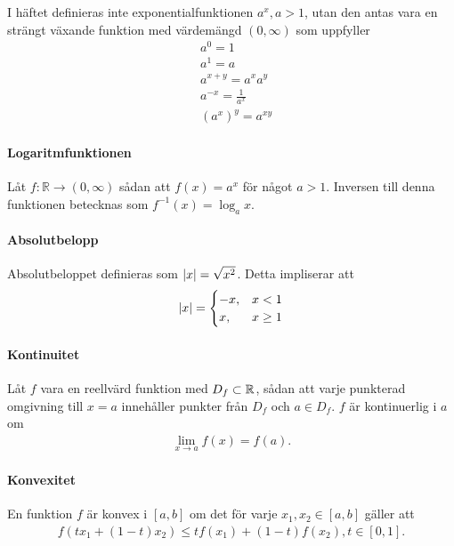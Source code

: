 I häftet definieras inte exponentialfunktionen $a^x, a>1$, utan den antas vara en strängt växande funktion med värdemängd $(0,\infty)$ som uppfyller
\begin{align*}
	&a^0 = 1\\
	&a^1 = a\\
	&a^{x + y} = a^x a^y\\
	&a^{-x} = \frac{1}{a^x}\\
	&\left(a^x\right)^y = a^{xy}
\end{align*}

\paragraph{Logaritmfunktionen}

Låt $f:\mathbb{R}\to (0,\infty)$ sådan att $f(x) = a^x$ för något $a > 1$. Inversen till denna funktionen betecknas som $f^{-1}(x) = \log_a x$.

\paragraph{Absolutbelopp}

Absolutbeloppet definieras som $\abs{x} = \sqrt{x^2}$. Detta impliserar att
\begin{align*}
	\abs{x} =
	\begin{cases}
		-x, & x < 1\\
		x,  & x \geq 1
	\end{cases}
\end{align*}
 
\paragraph{Kontinuitet}
Låt $f$ vara en reellvärd funktion med $D_f\subset\mathbb{R}$, sådan att varje punkterad omgivning till $x = a$ innehåller punkter från $D_f$ och $a\in D_f$. $f$ är kontinuerlig i $a$ om
\begin{align*}
	\lim\limits_{x\to a}f(x) = f(a).
\end{align*}

\paragraph{Konvexitet}
En funktion $f$ är konvex i $[a, b]$ om det för varje $x_1, x_2\in [a, b]$ gäller att
\begin{align*}
	f(tx_1 + (1 - t)x_2)\leq tf(x_1) + (1-t)f(x_2), t\in [0, 1].
\end{align*}

